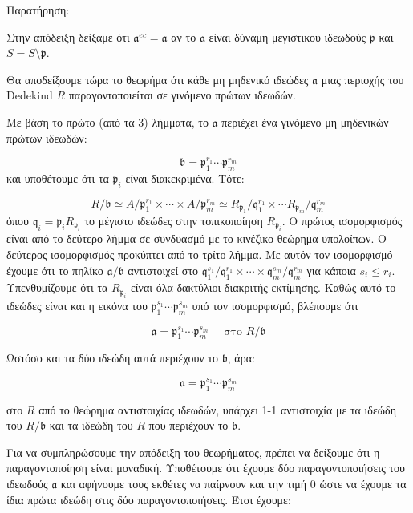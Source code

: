 \documentclass[oneside,a4paper]{article}
\newcommand {\tl}{\textlatin}
\begin{document}
Παρατήρηση:

Στην απόδειξη δείξαμε ότι $\mathfrak{a}^{ec} = \mathfrak{a}$ αν το $\mathfrak{a}$ είναι δύναμη μεγιστικού ιδεωδούς $\mathfrak{p}$ και $S = S\setminus \mathfrak{p}$.

Θα αποδείξουμε τώρα το θεωρήμα ότι κάθε μη μηδενικό ιδεώδες $\mathfrak{a}$ μιας περιοχής του \tl{Dedekind} $R$ παραγοντοποιείται σε γινόμενο πρώτων ιδεωδών.


Με βάση το πρώτο (από τα 3) λήμματα, το $\mathfrak{a}$ περιέχει ένα γινόμενο μη μηδενικών πρώτων ιδεωδών:

$$\mathfrak{b} = \mathfrak{p}^{r_1}_1 \cdots \mathfrak{p}^{r_m}_m$$ και υποθέτουμε ότι τα $\mathfrak{p}_i$ είναι διακεκριμένα. Τότε:

$$R/\mathfrak{b} \simeq A/\mathfrak{p}^{r_1}_1 \times \cdots \times A/\mathfrak{p}^{r_m}_m \simeq R_{\mathfrak{p}_1}/\mathfrak{q}^{r_1}_1 \times \cdots R_{\mathfrak{p}_m}/\mathfrak{q}^{r_m}_m $$ όπου $\mathfrak{q}_i = \mathfrak{p}_i R_{\mathfrak{p}_i}$ το μέγιστο ιδεώδες στην τοπικοποίηση $R_{\mathfrak{p}_i}$. Ο πρώτος ισομορφισμός είναι από το δεύτερο λήμμα σε συνδυασμό με το κινέζικο θεώρημα υπολοίπων. Ο δεύτερος ισομορφισμός προκύπτει από το τρίτο λήμμα. Με αυτόν τον ισομορφισμό έχουμε ότι το πηλίκο $\mathfrak{a}/\mathfrak{b}$ αντιστοιχεί στο $\mathfrak{q}^{s_1}_1/\mathfrak{q}^{r_1}_1 \times \cdots \times  \mathfrak{q}^{s_m}_m/\mathfrak{q}^{r_m}_m$ για κάποια $s_i \leq r_i$. Υπενθυμίζουμε ότι τα $R_{\mathfrak{p}_i}$ είναι όλα δακτύλιοι διακριτής εκτίμησης. Καθώς αυτό το ιδεώδες είναι και η εικόνα του $\mathfrak{p}^{s_1}_1 \cdots \mathfrak{p}^{s_m}_m$ υπό τον ισομορφισμό, βλέπουμε ότι

$$\mathfrak{a} = \mathfrak{p}^{s_1}_1 \cdots \mathfrak{p}^{s_m}_m \quad \text{ στο } R/\mathfrak{b}$$ 

Ωστόσο και τα δύο ιδεώδη αυτά περιέχουν το $\mathfrak{b}$, άρα:

$$\mathfrak{a} = \mathfrak{p}^{s_1}_1 \cdots \mathfrak{p}^{s_m}_m$$

στο $R$ από το θεώρημα αντιστοιχίας ιδεωδών, υπάρχει 1-1 αντιστοιχία με τα ιδεώδη του $R/\mathfrak{b}$ και τα ιδεώδη του $R$ που περιέχουν το $\mathfrak{b}$.

Για να συμπληρώσουμε την απόδειξη του θεωρήματος, πρέπει να δείξουμε ότι η παραγοντοποίηση είναι μοναδική. Υποθέτουμε ότι έχουμε δύο παραγοντοποιήσεις του ιδεωδούς $\mathfrak{a}$ και αφήνουμε τους εκθέτες να παίρνουν και την τιμή $0$ ώστε να έχουμε τα ίδια πρώτα ιδεώδη στις δύο παραγοντοποιήσεις. Έτσι έχουμε:
\end{document}
